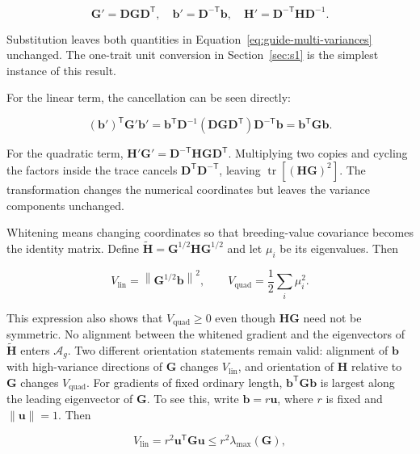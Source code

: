 \documentclass[11pt]{article}
\newcommand{\vect}[1]{\boldsymbol{#1}}
\newcommand{\mat}[1]{\mathbf{#1}}
\newcommand{\tr}{\operatorname{tr}}
\newcommand{\Ag}{\ensuremath{\mathcal A_g}}
\newcommand{\Vlin}{\ensuremath{V_{\mathrm{lin}}}}
\newcommand{\Vquad}{\ensuremath{V_{\mathrm{quad}}}}
\newcommand{\norm}[1]{\left\lVert#1\right\rVert}
\begin{document}
\begin{equation}
\mat G'=\mat D\mat G\mat D^{\mathsf T},\quad
\vect b'=\mat D^{-\mathsf T}\vect b,\quad
\mat H'=\mat D^{-\mathsf T}\mat H\mat D^{-1}.
\end{equation}

Substitution leaves both quantities in
Equation~\eqref{eq:guide-multi-variances} unchanged.  The one-trait unit
conversion in Section~\ref{sec:s1} is the simplest instance of this result.

For the linear term, the cancellation can be seen directly:

\begin{equation}
(\vect b')^{\mathsf T}\mat G'\vect b'
=\vect b^{\mathsf T}\mat D^{-1}
(\mat D\mat G\mat D^{\mathsf T})
\mat D^{-\mathsf T}\vect b
=\vect b^{\mathsf T}\mat G\vect b.
\end{equation}

For the quadratic term,
$\mat H'\mat G'=\mat D^{-\mathsf T}\mat H\mat G\mat D^{\mathsf T}$.
Multiplying two copies and cycling the factors inside the trace cancels
$\mat D^{\mathsf T}\mat D^{-\mathsf T}$, leaving
$\tr[(\mat H\mat G)^2]$.  The transformation changes the numerical coordinates but leaves the variance components unchanged.

Whitening means changing coordinates so that breeding-value covariance
becomes the identity matrix.  Define
$\widetilde{\mat H}=\mat G^{1/2}\mat H\mat G^{1/2}$ and let $\mu_i$ be its
eigenvalues.  Then

\begin{equation}
\Vlin=\norm{\mat G^{1/2}\vect b}^2,
\qquad
\Vquad=\frac12\sum_i\mu_i^2.
\end{equation}

This expression also shows that $\Vquad\geq0$ even though $\mat H\mat G$ need
not be symmetric.  No alignment between the whitened gradient and the
eigenvectors of $\widetilde{\mat H}$ enters \Ag.  Two different orientation
statements remain valid: alignment of $\vect b$ with high-variance directions
of $\mat G$ changes $\Vlin$, and orientation of $\mat H$ relative to
$\mat G$ changes $\Vquad$.  For gradients of fixed ordinary length,
$\vect b^{\mathsf T}\mat G\vect b$ is largest along the leading eigenvector of
$\mat G$.  To see this, write $\vect b=r\vect u$, where $r$ is fixed and
$\norm{\vect u}=1$.  Then

\begin{equation}
\Vlin=r^2\vect u^{\mathsf T}\mat G\vect u
\leq r^2\lambda_{\max}(\mat G),
\end{equation}
\end{document}
